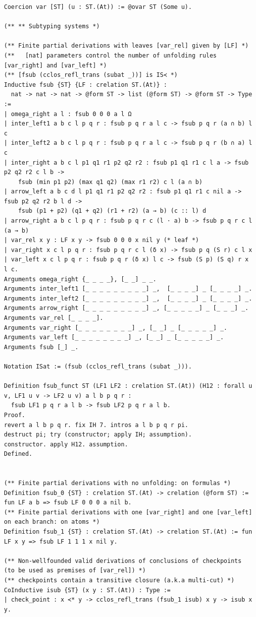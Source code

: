 \begin{lstlisting}
Coercion var [ST] (u : ST.(At)) := @ovar ST (Some u).

(** ** Subtyping systems *)

(** Finite partial derivations with leaves [var_rel] given by [LF] *)
(**   [nat] parameters control the number of unfolding rules [var_right] and [var_left] *)
(** [fsub (cclos_refl_trans (subat _))] is IS≺ *)
Inductive fsub {ST} {LF : crelation ST.(At)} :
  nat -> nat -> nat -> @form ST -> list (@form ST) -> @form ST -> Type :=
| omega_right a l : fsub 0 0 0 a l Ω
| inter_left1 a b c l p q r : fsub p q r a l c -> fsub p q r (a ∩ b) l c
| inter_left2 a b c l p q r : fsub p q r a l c -> fsub p q r (b ∩ a) l c
| inter_right a b c l p1 q1 r1 p2 q2 r2 : fsub p1 q1 r1 c l a -> fsub p2 q2 r2 c l b ->
    fsub (min p1 p2) (max q1 q2) (max r1 r2) c l (a ∩ b)
| arrow_left a b c d l p1 q1 r1 p2 q2 r2 : fsub p1 q1 r1 c nil a -> fsub p2 q2 r2 b l d ->
    fsub (p1 + p2) (q1 + q2) (r1 + r2) (a → b) (c :: l) d
| arrow_right a b c l p q r : fsub p q r c (l · a) b -> fsub p q r c l (a → b)
| var_rel x y : LF x y -> fsub 0 0 0 x nil y (* leaf *)
| var_right x c l p q r : fsub p q r c l (δ x) -> fsub p q (S r) c l x
| var_left x c l p q r : fsub p q r (δ x) l c -> fsub (S p) (S q) r x l c.
Arguments omega_right {_ _ _ _}, [_ _] _ _.
Arguments inter_left1 [_ _ _ _ _ _ _ _ _] _,  [_ _ _ _] _ [_ _ _ _] _.
Arguments inter_left2 [_ _ _ _ _ _ _ _ _] _,  [_ _ _ _] _ [_ _ _ _] _.
Arguments arrow_right [_ _ _ _ _ _ _ _ _] _, [_ _ _ _ _] _ [_ _ _] _.
Arguments var_rel [_ _ _ _].
Arguments var_right [_ _ _ _ _ _ _ _] _, [_ _] _ [_ _ _ _ _] _.
Arguments var_left [_ _ _ _ _ _ _ _] _, [_ _] _ [_ _ _ _ _] _.
Arguments fsub [_] _.

Notation ISat := (fsub (cclos_refl_trans (subat _))).

Definition fsub_funct ST (LF1 LF2 : crelation ST.(At)) (H12 : forall u v, LF1 u v -> LF2 u v) a l b p q r :
  fsub LF1 p q r a l b -> fsub LF2 p q r a l b.
Proof.
revert a l b p q r. fix IH 7. intros a l b p q r pi.
destruct pi; try (constructor; apply IH; assumption).
constructor. apply H12. assumption.
Defined.


(** Finite partial derivations with no unfolding: on formulas *)
Definition fsub_0 {ST} : crelation ST.(At) -> crelation (@form ST) := fun LF a b => fsub LF 0 0 0 a nil b.
(** Finite partial derivations with one [var_right] and one [var_left] on each branch: on atoms *)
Definition fsub_1 {ST} : crelation ST.(At) -> crelation ST.(At) := fun LF x y => fsub LF 1 1 1 x nil y.

(** Non-wellfounded valid derivations of conclusions of checkpoints (to be used as premises of [var_rel]) *)
(** checkpoints contain a transitive closure (a.k.a multi-cut) *)
CoInductive isub {ST} (x y : ST.(At)) : Type :=
| check_point : x ≺* y -> cclos_refl_trans (fsub_1 isub) x y -> isub x y.


\end{lstlisting}
